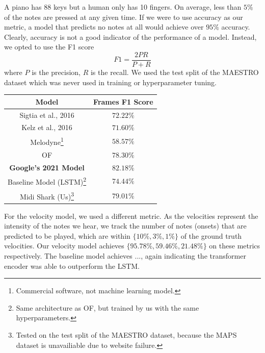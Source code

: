 \documentclass[a4paper,twocolumn,10pt]{article}
\makeatletter
\newcommand\footnoteref[1]{\protected@xdef\@thefnmark{\ref{#1}}\@footnotemark}
\makeatother
\begin{document}
A piano has 88 keys but a human only has 10 fingers. On average, less than $5\%$ of the notes are pressed at any given time. If we were to use accuracy as our metric, a model that predicts no notes at all would achieve over $95\%$ accuracy. Clearly, accuracy is not a good indicator of the performance of a model. Instead, we opted to use the F1 score
\begin{equation}
  F1 = \frac{2PR}{P+R}
\end{equation}
where $P$ is the precision, $R$ is the recall. We used the test split of the MAESTRO dataset which was never used in training or hyperparameter tuning.

\begin{table}[H]
  \begin{minipage}{\linewidth}
    \centering
    \begin{tabular}{|c|c|}
        \hline
        Model& Frames F1 Score \\
        \hline
        Sigtia et al., 2016 & \(72.22\%\)\\
        \hline
        Kelz et al., 2016 & \(71.60\%\)\\
        \hline
        Melodyne\footnote{Commercial software, not machine learning model.} & \(58.57\%\)\\
        \hline
        OF & \(78.30\%\)\\
        \hline
        \textbf{Google’s 2021 Model} & \(\mathbf{82.18\%}\)\\
        \hline
        Baseline Model (LSTM)\footnote{Same architecture as OF, but trained by us with the same hyperparameters.}\footnoteref{fn:midishark} & \(74.44\%\)\\
        \hline
        Midi Shark (Us)\footnote{\label{fn:midishark}Tested on the test split of the MAESTRO dataset, because the MAPS dataset is unavailiable due to website failure.} & \(79.01\%\)\\
        \hline
    \end{tabular}
  \end{minipage}
\end{table}

For the velocity model, we used a different metric. As the velocities represent the intensity of the notes we hear, we track the number of notes (onsets) that are predicted to be played, which are within \(\{10\%, 3\%, 1\%\}\) of the ground truth velocities. Our velocity model achieves \(\{95.78\%, 59.46\%, 21.48\%\}\) on these metrics respectively. The baseline model achieves ..., again indicating the transformer encoder was able to outperform the LSTM.
\end{document}
